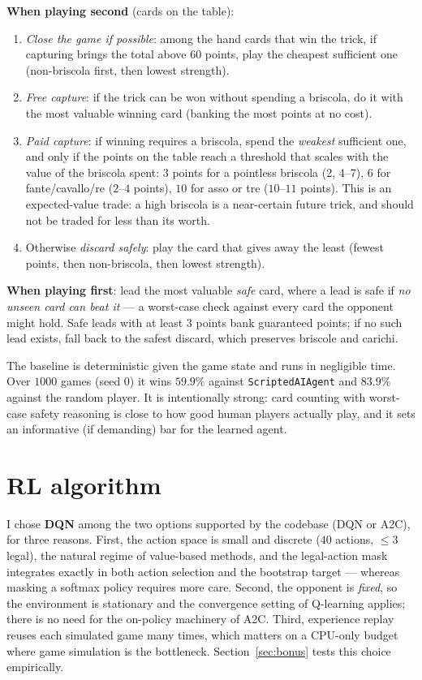 \documentclass{article}
\begin{document}
\textbf{When playing second} (cards on the table):
\begin{enumerate}
    \item \emph{Close the game if possible}: among the hand cards that win the trick, if capturing brings the total above $60$ points, play the cheapest sufficient one (non-briscola first, then lowest strength).
    \item \emph{Free capture}: if the trick can be won without spending a briscola, do it with the most valuable winning card (banking the most points at no cost).
    \item \emph{Paid capture}: if winning requires a briscola, spend the \emph{weakest} sufficient one, and only if the points on the table reach a threshold that scales with the value of the briscola spent: $3$ points for a pointless briscola (2, 4--7), $6$ for fante/cavallo/re ($2$--$4$ points), $10$ for asso or tre ($10$--$11$ points). This is an expected-value trade: a high briscola is a near-certain future trick, and should not be traded for less than its worth.
    \item Otherwise \emph{discard safely}: play the card that gives away the least (fewest points, then non-briscola, then lowest strength).
\end{enumerate}

\textbf{When playing first}: lead the most valuable \emph{safe} card, where a lead is safe if \emph{no unseen card can beat it} --- a worst-case check against every card the opponent might hold. Safe leads with at least $3$ points bank guaranteed points; if no such lead exists, fall back to the safest discard, which preserves briscole and carichi.

The baseline is deterministic given the game state and runs in negligible time. Over $1000$ games (seed 0) it wins $\mathbf{59.9\%}$ against \texttt{ScriptedAIAgent} and $83.9\%$ against the random player. It is intentionally strong: card counting with worst-case safety reasoning is close to how good human players actually play, and it sets an informative (if demanding) bar for the learned agent.

\section{RL algorithm}
\label{sec:algorithm}

I chose \textbf{DQN} \cite{mnih2015dqn} among the two options supported by the codebase (DQN or A2C), for three reasons. First, the action space is small and discrete ($40$ actions, $\leq 3$ legal), the natural regime of value-based methods, and the legal-action mask integrates exactly in both action selection and the bootstrap target --- whereas masking a softmax policy requires more care. Second, the opponent is \emph{fixed}, so the environment is stationary and the convergence setting of Q-learning applies; there is no need for the on-policy machinery of A2C. Third, experience replay reuses each simulated game many times, which matters on a CPU-only budget where game simulation is the bottleneck. Section~\ref{sec:bonus} tests this choice empirically.
\end{document}
